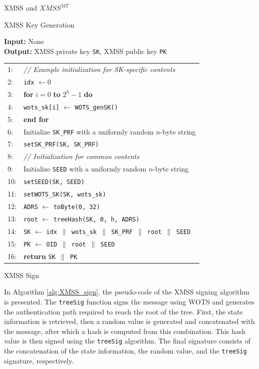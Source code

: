 \documentclass[version=preprint]{iacrcc}
\begin{document}
\begin{section}{XMSS and \texorpdfstring{$XMSS^{MT}$}{XMSS MT}}
\begin{subsection}{XMSS Key Generation}
        \begin{algorithm}
\caption{XMSS\_keyGen -- Generate an XMSS key pair}
\label{alg:XMSS_keygen}

\textbf{Input:} None \\
\textbf{Output:} XMSS private key \texttt{SK}, XMSS public key \texttt{PK}

\vspace{0.3cm}

\begin{tabular}{ll}
1: & \textit{// Example initialization for SK-specific contents} \\
2: & \texttt{idx} $\leftarrow 0$ \\
3: & \textbf{for} $i = 0$ \textbf{to} $2^h - 1$ \textbf{do} \\
4: & \quad \texttt{wots\_sk[i]} $\leftarrow$ \texttt{WOTS\_genSK()} \\
5: & \textbf{end for} \\
6: & Initialize \texttt{SK\_PRF} with a uniformly random $n$-byte string \\
7: & \texttt{setSK\_PRF(SK, SK\_PRF)} \\
8: & \textit{// Initialization for common contents} \\
9: & Initialize \texttt{SEED} with a uniformly random $n$-byte string \\
10: & \texttt{setSEED(SK, SEED)} \\
11: & \texttt{setWOTS\_SK(SK, wots\_sk)} \\
12: & \texttt{ADRS} $\leftarrow$ \texttt{toByte(0, 32)} \\
13: & \texttt{root} $\leftarrow$ \texttt{treeHash(SK, 0, h, ADRS)} \\
14: & \texttt{SK} $\leftarrow$ \texttt{idx $\parallel$ wots\_sk $\parallel$ SK\_PRF $\parallel$ root $\parallel$ SEED} \\
15: & \texttt{PK} $\leftarrow$ \texttt{OID $\parallel$ root $\parallel$ SEED} \\
16: & \textbf{return} \texttt{SK $\parallel$ PK}
\end{tabular}

\end{algorithm}

        
    \end{subsection}

    \begin{subsection}{XMSS Sign}

        In Algorithm \ref{alg:XMSS_sign}, the pseudo-code of the XMSS signing algorithm is presented. The \texttt{treeSig} function signs the message using WOTS and generates the authentication path required to reach the root of the tree. First, the state information is retrieved, then a random value is generated and concatenated with the message, after which a hash is computed from this combination. This hash value is then signed using the \texttt{treeSig} algorithm. The final signature consists of the concatenation of the state information, the random value, and the \texttt{treeSig} signature, respectively.



\end{subsection}
\end{section}
\end{document}
